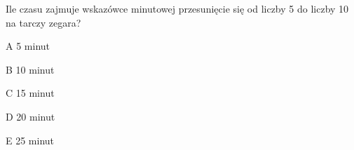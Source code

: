 \begin{tresc}
Ile czasu zajmuje wskazówce minutowej przesunięcie się od liczby 5 do liczby 10 na tarczy zegara?
\end{tresc}
\begin{wariant}{A} 5 minut \end{wariant}
\begin{wariant}{B} 10 minut \end{wariant}
\begin{wariant}{C} 15 minut \end{wariant}
\begin{wariant}{D} 20 minut \end{wariant}
\begin{wariant}{E} 25 minut \end{wariant}
